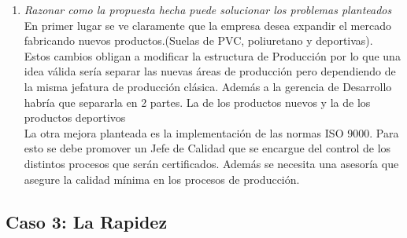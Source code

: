 \documentclass[a4paper,10pt]{article}
\begin{document}
\begin{enumerate}
				
				
						
			\item \textit{Razonar como la propuesta hecha puede solucionar los problemas planteados}\\
			
			En primer lugar se ve claramente que la empresa desea expandir el mercado fabricando nuevos productos.(Suelas de PVC, poliuretano y deportivas). Estos cambios obligan a modificar la estructura de Producción por lo que una idea válida sería separar las nuevas áreas de producción pero dependiendo de la misma jefatura de producción clásica. Además a la gerencia de Desarrollo habría que separarla en 2 partes. La de los productos nuevos y la de los productos deportivos\\
			La otra mejora planteada es la implementación de las normas ISO 9000. Para esto se debe promover un Jefe de Calidad que se encargue del control de los distintos procesos que serán certificados.
			Además se necesita una asesoría que asegure la calidad mínima en los procesos de producción.\\ 
			

			
			\end{enumerate}
		
	\subsection{Caso 3: La Rapidez}
\end{document}
